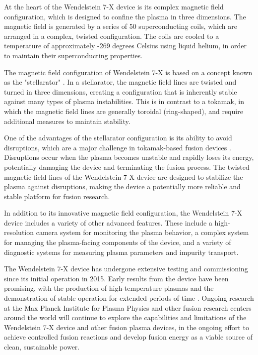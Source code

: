 \documentclass[12pt]{article}
\begin{document}
At the heart of the Wendelstein 7-X device is its complex magnetic field configuration, which is designed to confine the plasma in three dimensions. The magnetic field is generated by a series of 50 superconducting coils, which are arranged in a complex, twisted configuration. The coils are cooled to a temperature of approximately -269 degrees Celsius using liquid helium, in order to maintain their superconducting properties.

The magnetic field configuration of Wendelstein 7-X is based on a concept known as the "stellarator" \cite{w7x-stellarator}. In a stellarator, the magnetic field lines are twisted and turned in three dimensions, creating a configuration that is inherently stable against many types of plasma instabilities. This is in contrast to a tokamak, in which the magnetic field lines are generally toroidal (ring-shaped), and require additional measures to maintain stability.

One of the advantages of the stellarator configuration is its ability to avoid disruptions, which are a major challenge in tokamak-based fusion devices \cite{w7x-disruptions}. Disruptions occur when the plasma becomes unstable and rapidly loses its energy, potentially damaging the device and terminating the fusion process. The twisted magnetic field lines of the Wendelstein 7-X device are designed to stabilize the plasma against disruptions, making the device a potentially more reliable and stable platform for fusion research.

In addition to its innovative magnetic field configuration, the Wendelstein 7-X device includes a variety of other advanced features. These include a high-resolution camera system for monitoring the plasma behavior, a complex system for managing the plasma-facing components of the device, and a variety of diagnostic systems for measuring plasma parameters and impurity transport.

The Wendelstein 7-X device has undergone extensive testing and commissioning since its initial operation in 2015. Early results from the device have been promising, with the production of high-temperature plasmas and the demonstration of stable operation for extended periods of time \cite{w7x-initial-results}. Ongoing research at the Max Planck Institute for Plasma Physics and other fusion research centers around the world will continue to explore the capabilities and limitations of the Wendelstein 7-X device and other fusion plasma devices, in the ongoing effort to achieve controlled fusion reactions and develop fusion energy as a viable source of clean, sustainable power.
\end{document}
